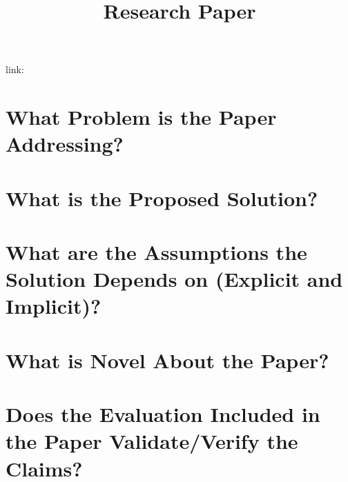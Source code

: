 \documentclass{article}
\title{Research Paper}
\begin{document}
\maketitle

link: 

\section{What Problem is the Paper Addressing?}

\section{What is the Proposed Solution?}

\section{What are the Assumptions the Solution Depends on (Explicit and Implicit)?}

\section{What is Novel About the Paper?}

\section{Does the Evaluation Included in the Paper Validate/Verify the Claims?}
\end{document}
